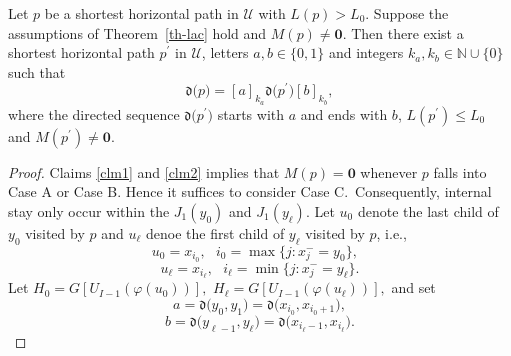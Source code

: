 \documentclass[10pt,a4paper]{amsart}
\begin{document}
\begin{lemma}
\label{le-kakb}Let $p$ be a shortest horizontal path in $\mathcal{U}$ with $%
L(p)>L_{0}$. Suppose the assumptions of Theorem\ \ref{th-lac} hold and $%
M(p)\neq \mathbf{0}$. Then there exist a shortest horizontal path $p^{\prime
}$ in $\mathcal{U}$, letters $a,b\in \{0,1\}$ and integers $k_{a},k_{b}\in 
\mathbb{N}\cup \{0\}$ such that 
\begin{equation*}
\mathfrak{d(}p)=[a]_{k_{a}}\mathfrak{d(}p^{\prime })[b]_{k_{b}},
\end{equation*}%
where the directed sequence $\mathfrak{d(}p^{\prime })$ starts with $a$ and
ends with $b$, $L(p^{\prime })\leq L_{0}$ and $M(p^{\prime })\neq 
\boldsymbol{0}$.
\end{lemma}

\begin{proof}
Claims \ref{clm1} and \ref{clm2} implies that $M(p)=\boldsymbol{0}$ whenever 
$p$ falls into Case A or Case B. Hence it suffices to consider Case C.\
Consequently, internal stay only occur within the $J_{1}(y_{0})$ and $%
J_{1}(y_{\ell }).$ Let $u_{0}$ denote the last child of $y_{0}$ visited by $%
p $ and $u_{\ell }$ denoe the first child of $y_{\ell }$ visited by $p$,
i.e.,%
\begin{equation*}
u_{0}=x_{i_{0}},\text{ }i_{0}=\max \{j:x_{j}^{-}=y_{0}\},\text{ }
\end{equation*}%
\begin{equation*}
u_{\ell }=x_{i_{\ell }},\text{ }i_{\ell }=\min \{j:x_{j}^{-}=y_{\ell }\}.
\end{equation*}%
Let $H_{0}=G[U_{I-1}(\varphi (u_{0}))],$ $H_{\ell }=G[U_{I-1}(\varphi
(u_{\ell }))],$ and set 
\begin{equation*}
a=\mathfrak{d(}y_{0},y_{1})=\mathfrak{d(}x_{i_{0}},x_{i_{0}+1}),
\end{equation*}%
\begin{equation*}
b=\mathfrak{d(}y_{\ell -1},y_{\ell })=\mathfrak{d(}x_{i_{\ell
}-1},x_{i_{\ell }}).
\end{equation*}


\end{proof}
\end{document}
